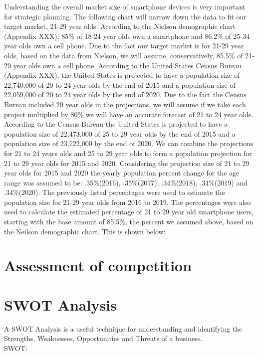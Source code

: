 

Understanding the overall market size of smartphone devices is very important for strategic planning. The following chart will narrow down the data to fit our target market, 21-29 year olds. According to the Nielson demographic chart (Appendix XXX), 85\% of 18-24 year olds own a smartphone and 86.2\% of 25-34 year olds own a cell phone. Due to the fact our target market is for 21-29 year olds, based on the data from Nielson, we will assume, conservatively, 85.5\% of 21-29 year olds own a cell phone. According to the United States Census Bureau (Appendix XXX), the United States is projected to have a population size of 22,740,000 of 20 to 24 year olds by the end of 2015 and a population size of 22,059,000 of 20 to 24 year olds by the end of 2020. Due to the fact the Census Bureau included 20 year olds in the projections, we will assume if we take each project multiplied by 80\% we will have an accurate forecast of 21 to 24 year olds. According to the Census Bureau the United States is projected to have a population size of 22,473,000 of 25 to 29 year olds by the end of 2015 and a population size of 23,722,000 by the end of 2020. We can combine the projections for 21 to 24 years olds and 25 to 29 year olds to form a population projection for 21 to 29 year olds for 2015 and 2020. Considering the projection size of 21 to 29 year olds for 2015 and 2020 the yearly population percent change for the age range was assumed to be: .35\%(2016), .35\%(2017), .34\%(2018), .34\%(2019) and .34\%(2020). The previously listed percentages were used to estimate the population size for 21-29 year olds from 2016 to 2019. The percentages were also used to calculate the estimated percentage of 21 to 29 year old smartphone users, starting with the base amount of 85.5\%, the percent we assumed above, based on the Neilson demographic chart. This is shown below:
 



\section {Assessment of competition}




\section{SWOT Analysis}

A SWOT Analysis is a useful technique for understanding and identifying the Strengths, Weaknesses, Opportunities and Threats of a business. \\
SWOT:\\

